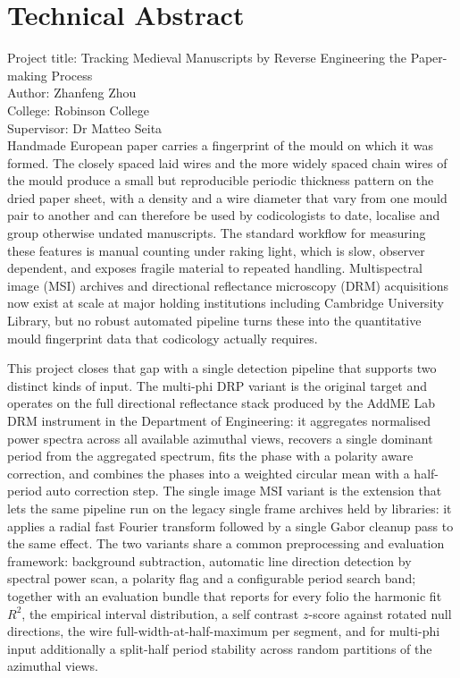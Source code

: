 
\section*{Technical Abstract}

\noindent Project title: Tracking Medieval Manuscripts by Reverse
Engineering the Paper-making Process\\
Author: Zhanfeng Zhou\\
College: Robinson College\\
Supervisor: Dr Matteo Seita\\[1em]

Handmade European paper carries a
fingerprint of the mould on which it was formed. The closely
spaced laid wires and the more widely spaced chain wires of the
mould produce a small but reproducible periodic thickness
pattern on the dried paper sheet, with a density and a wire diameter
that vary from one mould pair to another and can therefore be
used by codicologists to date, localise and group otherwise
undated manuscripts. The standard workflow for measuring these
features is manual counting under raking light, which is slow,
observer dependent, and exposes fragile material to repeated
handling. Multispectral image (MSI) archives and directional
reflectance microscopy (DRM) acquisitions now exist at scale at
major holding institutions including Cambridge University
Library, but no robust automated pipeline turns these into the
quantitative mould fingerprint data that codicology actually
requires.

This project closes that gap with a single detection pipeline
that supports two distinct kinds of input. The multi-phi DRP
variant is the original target and operates on the full
directional reflectance stack produced by the AddME Lab DRM
instrument in the Department of Engineering: it aggregates
normalised power spectra across all available azimuthal views,
recovers a single dominant period from the aggregated spectrum,
fits the phase with a polarity aware correction, and
combines the phases into a weighted circular mean with a
half-period auto correction step. The single image MSI variant is
the extension that lets the same pipeline run on the legacy
single frame archives held by libraries: it applies a radial
fast Fourier transform followed by a single Gabor cleanup pass to
the same effect. The two variants share a common preprocessing
and evaluation framework: background subtraction, automatic
line direction detection by spectral power scan, a polarity flag
and a configurable period search band; together with an
evaluation bundle that reports for every folio the harmonic fit
$R^2$, the empirical interval distribution, a self contrast
$z$-score against rotated null directions, the wire
full-width-at-half-maximum per segment, and for multi-phi input additionally
a split-half period stability across random partitions of the
azimuthal views.

